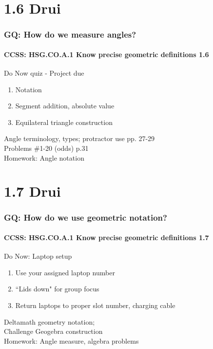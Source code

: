 \documentclass{beamer}
\begin{document}
\section{1.6 Drui}
  \frame
  {
    \frametitle{GQ: How do we measure angles?}
    \framesubtitle{CCSS: HSG.CO.A.1 Know precise geometric definitions  \alert{1.6}}

    \begin{block}{Do Now quiz - \alert{Project due}}
    \begin{enumerate}
        \item Notation
        \item Segment addition, absolute value
        \item Equilateral triangle construction
    \end{enumerate}
    \end{block}
    Angle terminology, types; protractor use pp. 27-29\\
    Problems \#1-20 (odds) p.31\\
    \vspace{1cm}
    Homework: Angle notation
  }

\section{1.7 Drui}
  \frame
  {
    \frametitle{GQ: How do we use geometric notation?}
    \framesubtitle{CCSS: HSG.CO.A.1 Know precise geometric definitions  \alert{1.7}}

    \begin{block}{Do Now: Laptop setup}
    \begin{enumerate}
        \item Use your assigned laptop number
        \item ``Lids down" for group focus
        \item Return laptops to proper slot number, charging cable
    \end{enumerate}
    \end{block}
    Deltamath geometry notation; \\Challenge Geogebra construction\\
    \vspace{1cm}
    Homework: Angle measure, algebra problems
  }
\end{document}
